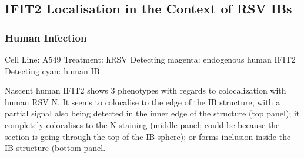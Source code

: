 \subsection{IFIT2 Localisation in the Context of RSV IBs} \label{subsec:IFIT2 Localisation in the Context of RSV IBs}
\subsubsection{Human Infection}
Cell Line: A549 \newline
Treatment: hRSV \newline
Detecting magenta: endogenous human IFIT2  \newline
Detecting cyan: human IB \newline

Nascent human IFIT2 shows 3 phenotypes with regards to colocalization with human RSV N. It seems to colocalise to the edge of the IB structure, with a partial signal also being detected in the inner edge of the structure (top panel); it completely colocalises to the N staining (middle panel; could be because the section is going through the top of the IB sphere); or forms inclusion inside the IB structure (bottom panel. 

